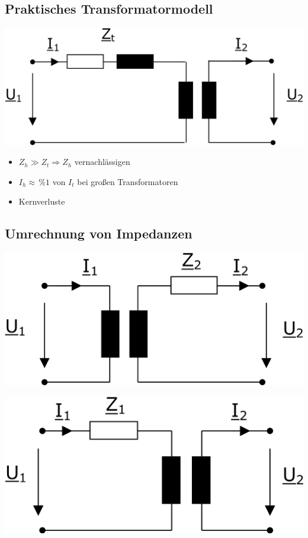 \subsection{Praktisches Transformatormodell}

\includegraphics[width=0.98\columnwidth, align=c]{images/Praktisches_Transformatorbild_2.png}

\vspace{0.15cm}

\begin{itemize}
    \item \( Z_h \gg Z_t \Rightarrow Z_h \) vernachlässigen
    \item \( I_h \approx \,\%\!1 \) von \( I_t \) bei großen Transformatoren
    \item Kernverluste
\end{itemize}


\subsection{Umrechnung von Impedanzen}


\begin{minipage}[t]{0.48\columnwidth}
    \includegraphics[width=0.98\columnwidth, align=c]{images/Umrechnung_Impedanzen_1.png}
\end{minipage}
\hfill
\begin{minipage}[t]{0.48\columnwidth}
    \includegraphics[width=0.98\columnwidth, align=c]{images/Umrechnung_Impedanzen_2.png}
\end{minipage}

